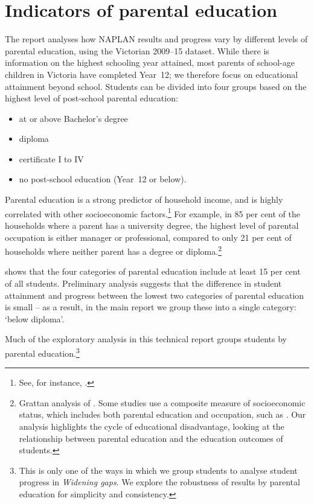 \section{Indicators of parental education}

The report analyses how NAPLAN results and progress vary by different levels of parental education, using the Victorian 2009--15 dataset. While there is information on the highest schooling year attained, most parents of school-age children in Victoria have completed \mbox{Year 12}; we therefore focus on educational attainment beyond school. Students can be divided into four groups based on the highest level of post-school parental education:
\begin{itemize}
\item at or above Bachelor's degree
\item diploma
\item certificate I to IV
\item no post-school education (\mbox{Year 12} or below).
\end{itemize}
Parental education is a strong predictor of household income, and is highly correlated with other socioeconomic factors.\footnote{See, for instance, \textcite{oecd2015}.} For example, in 85 per cent of the households where a parent has a university degree, the highest level of parental occupation is either manager or professional, compared to only 21 per cent of households where neither parent has a degree or diploma.\footnote{Grattan analysis of \textcite{vcaa2015}. Some studies use a composite measure of socioeconomic status, which includes both parental education and occupation, such as \textcite{marks2015,houng2015}. Our analysis highlights the cycle of educational disadvantage, looking at the relationship between parental education and the education outcomes of students.}

 shows that the four categories of parental education include at least 15 per cent of all students. Preliminary analysis suggests that the difference in student attainment and progress between the lowest two categories of parental education is small -- as a result, in the main report we group these into a single category: `below diploma'.

Much of the exploratory analysis in this technical report groups students by parental education.\footnote{This is only one of the ways in which we group students to analyse student progress in \textit{Widening gaps}. We explore the robustness of results by parental education for simplicity and consistency.}

